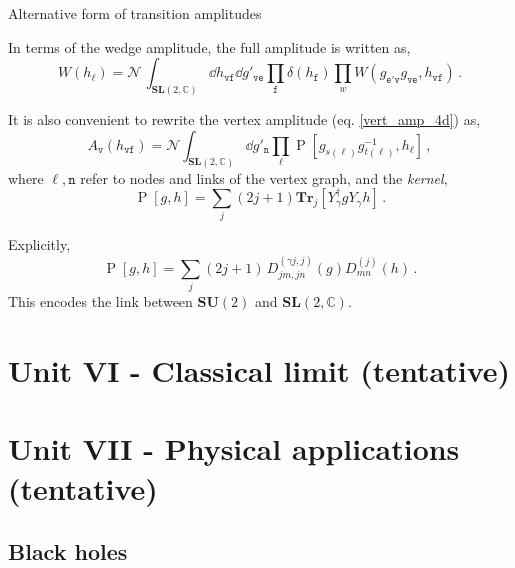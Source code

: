 \documentclass{beamer}
\newcommand\italictext[1]{\textcolor{italics}{\textit{#1}}}
\begin{document}
\begin{frame}{Alternative form of transition amplitudes}
    \begin{list}{\maltese}{\leftmargin=1em \itemindent=0em}
        \item<1-> In terms of the wedge amplitude, the full amplitude is written as,
        \begin{equation}
            W(h_\ell)=\mathcal{N}\,\int_{{\mathbf{SL}(2,\mathbb{C})}}\dd{h_\mathtt{vf}}\dd{g'_\mathtt{ve}}\prod_{\mathtt{f}}\delta(h_\mathtt{f})\prod_w W(g_\mathtt{e'v}g_\mathtt{ve},h_\mathtt{vf})\,.
        \end{equation}
        \item<2-> It is also convenient to rewrite the vertex amplitude (eq. \ref{vert_amp_4d}) as,
        \begin{equation}
            A_\mathtt{v}(h_\mathtt{vf})=\mathcal{N}\int_{{\mathbf{SL}(2,\mathbb{C})}}\dd{g'_\mathtt{n}}\prod_\ell\operatorname{P}[g_{s(\ell)}g^{-1}_{t(\ell)},h_\ell]\,,
        \end{equation}
        where $\ell,\mathtt{n}$ refer to nodes and links of the vertex graph, and the \italictext{kernel},
        \begin{equation}
            \operatorname{P}[g,h]=\sum_j(2j+1)\mathbf{Tr}_{j}[Y_\gamma^\dagger g Y_\gamma h]\,.
        \end{equation}
        \item<3-> Explicitly,
        \begin{equation}
            \operatorname{P}[g,h]=\sum_j(2j+1)\,D^{(\gamma j,j)}_{jm,jn}(g) D^{(j)}_{mn}(h)\,.
        \end{equation}
        This encodes the link between $\mathbf{SU}(2)$ and $\mathbf{SL}(2,\mathbb{C})$.
    \end{list}
\end{frame}

\section{Unit VI - Classical limit (tentative)}

\section{Unit VII - Physical applications (tentative)}

\subsection{Black holes}
\end{document}
